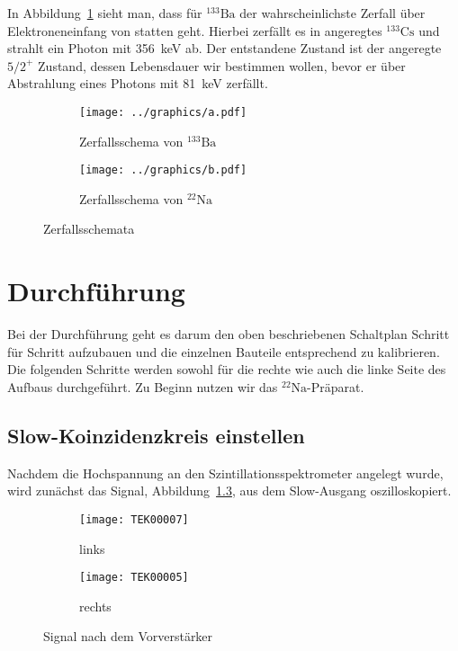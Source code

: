 \documentclass[11pt, ngerman, fleqn, DIV=15, headinclude, BCOR=2cm]{scrreprt}
\begin{document}
In Abbildung~\ref{fig:barium} sieht man, dass für $^{133}\text{Ba}$ der wahrscheinlichste Zerfall über
Elektroneneinfang von statten geht. Hierbei zerfällt es in angeregtes
$^{133}\text{Cs}$ und strahlt ein Photon mit \SI{356}{\kilo\electronvolt} ab. Der entstandene
Zustand ist der angeregte $5/2^+$ Zustand, dessen Lebensdauer wir
bestimmen wollen, bevor er über Abstrahlung eines Photons mit \SI{81}{\kilo\electronvolt}
zerfällt.

\begin{figure}
	\centering
	\begin{subfigure}{0.49 \textwidth}
		\texttt{[image: ../graphics/a.pdf]}
		\caption{%
                    Zerfallsschema von $^{133}\text{Ba}$
		}
		\label{fig:barium}
	\end{subfigure}
	\begin{subfigure}{0.49 \textwidth}
		\texttt{[image: ../graphics/b.pdf]}
		\caption{%
                    Zerfallsschema von $^{22}\text{Na}$
		}
		\label{fig:natrium}
	\end{subfigure}
	\caption{%
		Zerfallsschemata
	}
	\label{fig:zerfallsschema}
\end{figure}


\chapter{Durchführung}


Bei der Durchführung geht es darum den oben beschriebenen Schaltplan Schritt
für Schritt aufzubauen und die einzelnen Bauteile entsprechend zu
kalibrieren. Die folgenden Schritte werden sowohl für die rechte wie auch die
linke Seite des Aufbaus durchgeführt. Zu Beginn nutzen wir das
$^{22}\text{Na}$-Präparat. 

\section{Slow-Koinzidenzkreis einstellen}
Nachdem die Hochspannung an den Szintillationsspektrometer angelegt wurde, wird
zunächst das Signal, Abbildung~\ref{fig:slow_signal}, aus dem Slow-Ausgang oszilloskopiert.

\begin{figure}[htbp]
	\centering
	\begin{subfigure}{0.49 \textwidth}
		\texttt{[image: TEK00007]}
		\caption{%
			links
		}
		\label{fig:slow_signal-li}
	\end{subfigure}
	\begin{subfigure}{0.49 \textwidth}
		\texttt{[image: TEK00005]}
		\caption{%
			rechts
		}
		\label{fig:slow_signal-re}
	\end{subfigure}
	\caption{%
		Signal nach dem Vorverstärker
	}
	\label{fig:slow_signal}
\end{figure}
\end{document}
